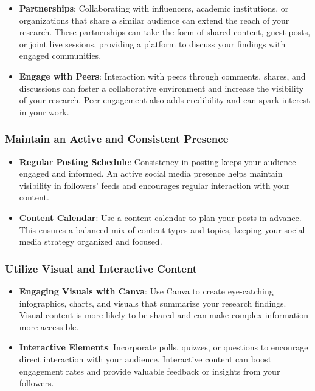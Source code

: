 \documentclass[
]{book}
\begin{document}
\begin{itemize}
\item
  \textbf{Partnerships}: Collaborating with influencers, academic institutions, or organizations that share a similar audience can extend the reach of your research. These partnerships can take the form of shared content, guest posts, or joint live sessions, providing a platform to discuss your findings with engaged communities.
\item
  \textbf{Engage with Peers}: Interaction with peers through comments, shares, and discussions can foster a collaborative environment and increase the visibility of your research. Peer engagement also adds credibility and can spark interest in your work.
\end{itemize}

\hypertarget{maintain-an-active-and-consistent-presence}{%
\subsubsection*{Maintain an Active and Consistent Presence}\label{maintain-an-active-and-consistent-presence}}

\begin{itemize}
\item
  \textbf{Regular Posting Schedule}: Consistency in posting keeps your audience engaged and informed. An active social media presence helps maintain visibility in followers' feeds and encourages regular interaction with your content.
\item
  \textbf{Content Calendar}: Use a content calendar to plan your posts in advance. This ensures a balanced mix of content types and topics, keeping your social media strategy organized and focused.
\end{itemize}

\hypertarget{utilize-visual-and-interactive-content}{%
\subsubsection*{Utilize Visual and Interactive Content}\label{utilize-visual-and-interactive-content}}

\begin{itemize}
\item
  \textbf{Engaging Visuals with Canva}: Use Canva to create eye-catching infographics, charts, and visuals that summarize your research findings. Visual content is more likely to be shared and can make complex information more accessible.
\item
  \textbf{Interactive Elements}: Incorporate polls, quizzes, or questions to encourage direct interaction with your audience. Interactive content can boost engagement rates and provide valuable feedback or insights from your followers.
\end{itemize}
\end{document}
